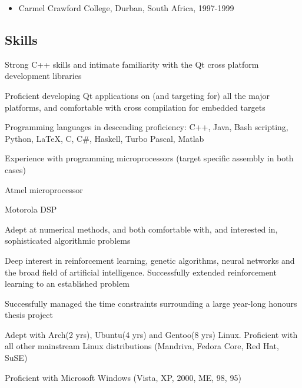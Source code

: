 \documentclass{article}
\begin{document}
\begin{itemize}
\item{	Carmel Crawford College, Durban, South Africa, 1997-1999}
\end{itemize}

\subsection*{Skills}
\begin{itemize*}
\item{ Strong C++ skills and intimate familiarity with the Qt cross platform development libraries}
\item{ Proficient developing Qt applications on (and targeting for) all the major platforms, and comfortable with cross compilation for embedded targets }
\item{ Programming languages in descending proficiency: C++, Java, Bash scripting, Python, \LaTeX, C, C\#, Haskell, Turbo Pascal, Matlab}
\item{ Experience with programming microprocessors (target specific assembly in both cases) }
\begin{itemize*}
\item{ Atmel microprocessor}
\item{ Motorola DSP}
\end{itemize*}
\item{ Adept at numerical methods, and both comfortable with, and interested in, sophisticated algorithmic problems}
\item{ Deep interest in reinforcement learning, genetic algorithms, neural networks and the broad field of artificial intelligence. Successfully extended reinforcement learning to an established problem}
\item{ Successfully managed the time constraints surrounding a large year-long honours thesis project}
\item{ Adept with Arch(2 yrs), Ubuntu(4 yrs) and Gentoo(8 yrs) Linux. Proficient with all other mainstream Linux distributions (Mandriva, Fedora Core, Red Hat, SuSE)}
\item{ Proficient with Microsoft Windows (Vista, XP, 2000, ME, 98, 95)}
\end{itemize*}
\end{document}
